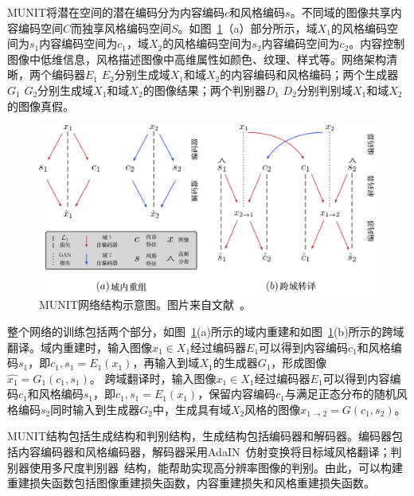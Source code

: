 MUNIT将潜在空间的潜在编码分为内容编码$c$和风格编码$s$。不同域的图像共享内容编码空间$C$而独享风格编码空间$S$。如图~\ref{fig:munit}（a）部分所示，域$X_1$的风格编码空间为$s_1$内容编码空间为$c_1$，域$X_2$的风格编码空间为$s_2$内容编码空间为$c_2$。内容控制图像中低维信息，风格描述图像中高维属性如颜色、纹理、样式等。网络架构清晰，两个编码器$E_1$ $E_2$分别生成域$X_1$和域$X_2$的内容编码和风格编码；两个生成器$G_1$ $G_2$分别生成域$X_1$和域$X_2$的图像结果；两个判别器$D_1$ $D_2$分别判别域$X_1$和域$X_2$的图像真假。

\begin{figure}[ht]
    \centering
	\includegraphics[width=\textwidth]{figures/munit.pdf}
	\caption{MUNIT网络结构示意图。图片来自文献~\cite{huang2018multimodal}。}
	\label{fig:munit}
\end{figure}

整个网络的训练包括两个部分，如图~\ref{fig:munit}(a)所示的域内重建和如图~\ref{fig:munit}(b)所示的跨域翻译。域内重建时，输入图像$x_1 \in X_1$经过编码器$E_1$可以得到内容编码$c_1$和风格编码$s_1$，即$c_1,s_1=E_1(x_1)$，再输入到域$X_1$的生成器$G_1$，形成图像$\hat{x_1}=G_1(c_1,s_1)$。
跨域翻译时，输入图像$x_1 \in X_1$经过编码器$E_1$可以得到内容编码$c_1$和风格编码$s_1$，即$c_1,s_1=E_1(x_1)$，保留内容编码$c_1$与满足正态分布的随机风格编码$s_2$同时输入到生成器$G_2$中，生成具有域$X_2$风格的图像$x_{1 \rightarrow 2}=G(c_1,s_2)$。

MUNIT结构包括生成结构和判别结构，生成结构包括编码器和解码器。编码器包括内容编码器和风格编码器，解码器采用AdaIN~\cite{huang2017arbitrary}仿射变换将目标域风格翻译；判别器使用多尺度判别器~\cite{wang2018high}结构，能帮助实现高分辨率图像的判别。由此，可以构建重建损失函数包括图像重建损失函数，内容重建损失和风格重建损失函数。

